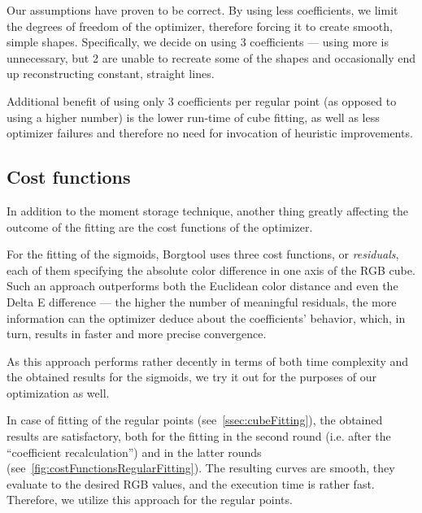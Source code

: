 Our assumptions have proven to be correct. By using less coefficients, we limit the degrees of freedom of the optimizer, therefore forcing it to create smooth, simple shapes. Specifically, we decide on using 3 coefficients --- using more is unnecessary, but 2 are unable to recreate some of the shapes and occasionally end up reconstructing constant, straight lines.

Additional benefit of using only 3 coefficients per regular point (as opposed to using a higher number) is the lower run-time of cube fitting, as well as less optimizer failures and therefore no need for invocation of heuristic improvements.

\subsection{Cost functions} \label{ssec:costFunctions}

In addition to the moment storage technique, another thing greatly affecting the outcome of the fitting are the cost functions of the optimizer.

For the fitting of the sigmoids, Borgtool uses three cost functions, or \emph{residuals}, each of them specifying the absolute color difference in one axis of the RGB cube. Such an approach outperforms both the Euclidean color distance and even the Delta E difference --- the higher the number of meaningful residuals, the more information can the optimizer deduce about the coefficients' behavior, which, in turn, results in faster and more precise convergence.

As this approach performs rather decently in terms of both time complexity and the obtained results for the sigmoids, we try it out for the purposes of our optimization as well. 

In case of fitting of the regular points (see~\cref{ssec:cubeFitting}), the obtained results are satisfactory, both for the fitting in the second round (i.e. after the ``coefficient recalculation'') and in the latter rounds (see~\cref{fig:costFunctionsRegularFitting}). The resulting curves are smooth, they evaluate to the desired RGB values, and the execution time is rather fast. Therefore, we utilize this approach for the regular points.


